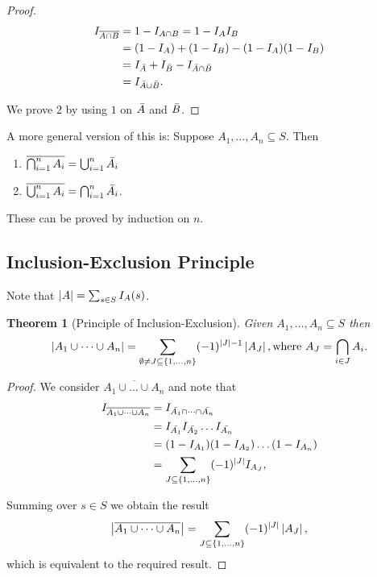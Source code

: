 \documentclass{notes}
\theoremstyle{plain}
\newtheorem{theorem}{Theorem}[chapter]
\begin{document}
\begin{proof}
\begin{align*}
I_{\overline{A \cap B}} &= 1- I_{A \cap B} = 1 - I_A I_B \\
&= (1-I_A) + (1-I_B) - (1-I_A)(1-I_B) \\
&= I_{\Bar{A}} + I_{\Bar{B}} - I_{\Bar{A} \cap \Bar{B}} \\
&= I_{\Bar{A} \cup \Bar{B}}.
\end{align*}

We prove $2$ by using $1$ on $\Bar{A}$ and $\Bar{B}$.
\end{proof}

A more general version of this is:  Suppose $A_1, \dots, A_n \subseteq S$.
Then
\begin{enumerate}
\item $\overline{\bigcap_{i=1}^n A_i} = \bigcup_{i=1}^n \Bar{A_i}$
\item $\overline{\bigcup_{i=1}^n A_i} = \bigcap_{i=1}^n \Bar{A_i}$.
\end{enumerate}
These can be proved by induction on $n$.


\subsection{Inclusion-Exclusion Principle}

Note that $\left|A\right| = \sum_{s \in S} I_A(s)$.

\begin{theorem}[Principle of Inclusion-Exclusion]\label{T:PIE}
Given $A_1, \dots, A_n \subseteq S$ then
\[
\left|A_1 \cup \dots \cup A_n\right| = \sum_{\emptyset \neq J \subseteq \{1,\dots,n\}}
(-1)^{\left|J\right| - 1} \left|A_J\right|, \text{where $A_J = \bigcap_{i \in J} A_i$.} 
\]
\end{theorem}

\begin{proof}
We consider $\overline{A_1 \cup \dots \cup A_n}$ and note that
\begin{align*}
I_{\overline{A_1 \cup \dots \cup A_n}} &= I_{\Bar{A_1} \cap \dots \cap
\Bar{A_n}} \\
&= I_{\Bar{A_1}} I_{\Bar{A_2}} \dots I_{\Bar{A_n}} \\
&= (1-I_{A_1}) (1 - I_{A_2}) \dots (1 - I_{A_n}) \\
&= \sum_{J \subseteq \{ 1, \dots, n \}} (-1)^{\left|J\right|} I_{A_J},
\end{align*}

Summing over $s \in S$ we obtain the result
\[
\left|\overline{A_1 \cup \dots \cup A_n}\right| = \sum_{J \subseteq
\{ 1, \dots, n \}} (-1)^{\left|J\right|} \left|A_J\right|,
\]
which is equivalent to the required result.
\end{proof}
\end{document}
